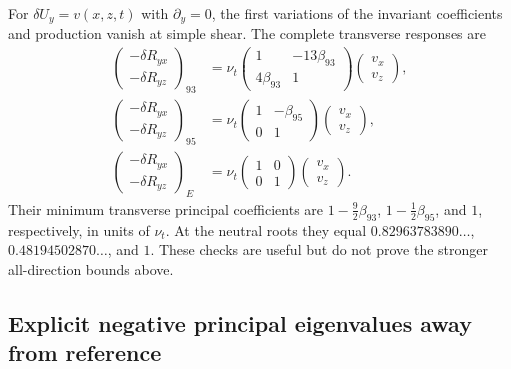 \documentclass[11pt,a4paper]{article}
\numberwithin{equation}{section}
\newcommand{\nut}{\nu_t}
\begin{document}
For $\delta U_y=v(x,z,t)$ with $\partial_y=0$, the first variations
of the invariant coefficients and production vanish at simple shear.
The complete transverse responses are
\begin{equation}
 \begin{aligned}
 \begin{pmatrix}-\delta R_{yx}\\-\delta R_{yz}\end{pmatrix}_{93}
 &=\nut\begin{pmatrix}1&-13\beta_{93}\\4\beta_{93}&1\end{pmatrix}
          \begin{pmatrix}v_x\\v_z\end{pmatrix},\\
 \begin{pmatrix}-\delta R_{yx}\\-\delta R_{yz}\end{pmatrix}_{95}
 &=\nut\begin{pmatrix}1&-\beta_{95}\\0&1\end{pmatrix}
          \begin{pmatrix}v_x\\v_z\end{pmatrix},\\
 \begin{pmatrix}-\delta R_{yx}\\-\delta R_{yz}\end{pmatrix}_{E}
 &=\nut\begin{pmatrix}1&0\\0&1\end{pmatrix}
          \begin{pmatrix}v_x\\v_z\end{pmatrix}.
 \end{aligned}
 \label{st:transverse-blocks}
\end{equation}
Their minimum transverse principal coefficients are
$1-\tfrac92\beta_{93}$, $1-\tfrac12\beta_{95}$, and $1$,
respectively, in units of $\nut$. At the neutral roots they equal
$0.82963783890\ldots$, $0.48194502870\ldots$, and $1$.
These checks are useful but do not prove the stronger all-direction
bounds above.

\subsection{Explicit negative principal eigenvalues away from reference}
\label{st:failures}
\end{document}
